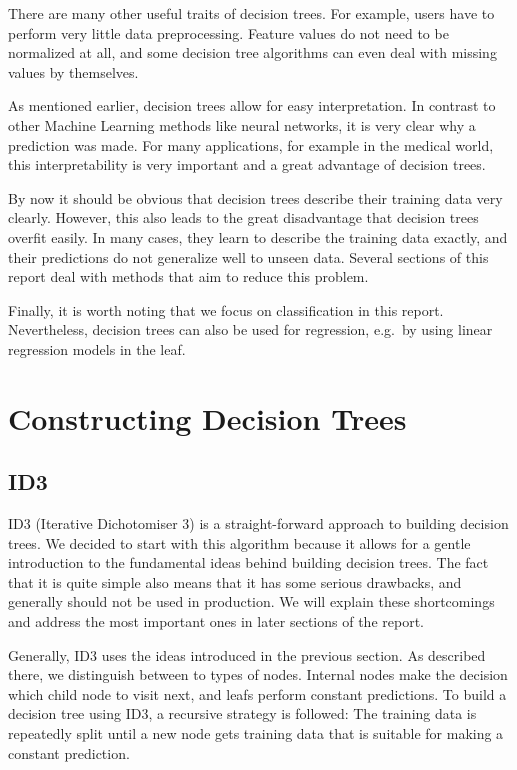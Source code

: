 \documentclass[a4paper]{article}
\begin{document}
There are many other useful traits of decision trees. For example, users have to perform very little data preprocessing. Feature values do not need to be normalized at all, and some decision tree algorithms can even deal with missing values by themselves.

As mentioned earlier, decision trees allow for easy interpretation. In contrast to other Machine Learning methods like neural networks, it is very clear why a prediction was made. For many applications, for example in the medical world, this interpretability is very important and a great advantage of decision trees.

By now it should be obvious that decision trees describe their training data very clearly. However, this also leads to the great disadvantage that decision trees overfit easily. In many cases, they learn to describe the training data exactly, and their predictions do not generalize well to unseen data. Several sections of this report deal with methods that aim to reduce this problem.

Finally, it is worth noting that we focus on classification in this report. Nevertheless, decision trees can also be used for regression, e.g.\ by using linear regression models in the leaf.

\section{Constructing Decision Trees}

\subsection{ID3}

ID3 (Iterative Dichotomiser 3) is a straight-forward approach to building decision trees. We decided to start with this algorithm because it allows for a gentle introduction to the fundamental ideas behind building decision trees.
The fact that it is quite simple also means that it has some serious drawbacks, and generally should not be used in production. We will explain these shortcomings and address the most important ones in later sections of the report.

Generally, ID3 uses the ideas introduced in the previous section.
As described there, we distinguish between to types of nodes. Internal nodes make the decision which child node to visit next, and leafs perform constant predictions.
To build a decision tree using ID3, a recursive strategy is followed: The training data is repeatedly split until a new node gets training data that is suitable for making a constant prediction.
\end{document}
